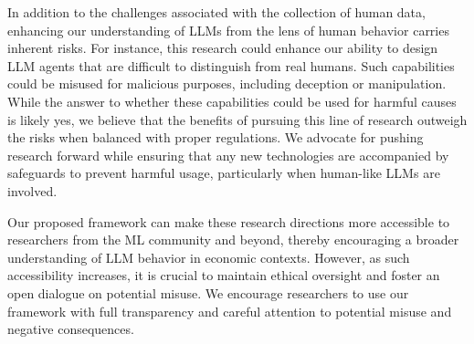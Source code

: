 In addition to the challenges associated with the collection of human data, enhancing our understanding of LLMs from the lens of human behavior carries inherent risks. For instance, this research could enhance our ability to design LLM agents that are difficult to distinguish from real humans. Such capabilities could be misused for malicious purposes, including deception or manipulation. While the answer to whether these capabilities could be used for harmful causes is likely yes, we believe that the benefits of pursuing this line of research outweigh the risks when balanced with proper regulations. We advocate for pushing research forward while ensuring that any new technologies are accompanied by safeguards to prevent harmful usage, particularly when human-like LLMs are involved.

Our proposed framework can make these research directions more accessible to researchers from the ML community and beyond, thereby encouraging a broader understanding of LLM behavior in economic contexts. However, as such accessibility increases, it is crucial to maintain ethical oversight and foster an open dialogue on potential misuse. We encourage researchers to use our framework with full transparency and careful attention to potential misuse and negative consequences.

